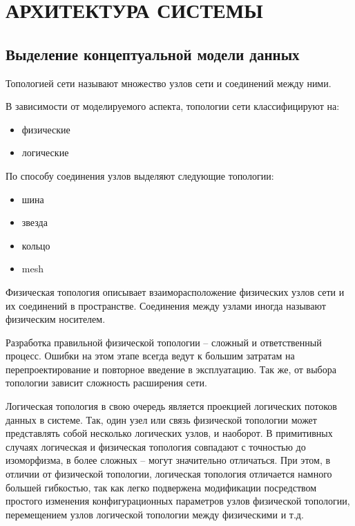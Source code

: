 \chapter{АРХИТЕКТУРА СИСТЕМЫ}

\section{Выделение концептуальной модели данных}

Топологией  сети называют множество узлов сети и соединений между ними. 

В зависимости от моделируемого аспекта, топологии сети классифицируют на:
\begin{itemize}
    \item физические
    \item логические
\end{itemize}

По способу соединения узлов выделяют следующие топологии:
\begin{itemize}
    \item шина
    \item звезда
    \item кольцо
    \item mesh %
\end{itemize}

Физическая топология описывает взаиморасположение физических узлов сети и их соединений в 
пространстве. Соединения между узлами иногда называют физическим носителем.

Разработка правильной физической топологии -- сложный и ответственный процесс.
Ошибки на этом этапе всегда ведут к большим затратам на перепроектирование и повторное 
введение в эксплуатацию. Так же, от выбора топологии зависит сложность расширения
сети.

Логическая топология в свою очередь является проекцией логических потоков данных
в системе. Так, один узел или связь физической топологии может представлять собой несколько 
логических узлов, и наоборот. В примитивных случаях логическая и физическая топология 
совпадают с точностью до изоморфизма, в более сложных -- могут значительно отличаться.
При этом, в отличии от физической топологии, логическая топология отличается намного
большей гибкостью, так как легко подвержена модификации посредством простого
изменения конфигурационных параметров узлов физической топологии, перемещением
узлов логической топологии между физическими и т.д.

